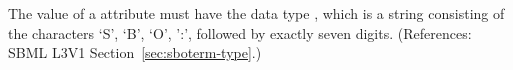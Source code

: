 The value of a  attribute must have the data type
, which is a string consisting of the characters `S', `B',
`O', ':', followed by exactly seven digits.  (References: SBML
L3V1 Section~\ref{sec:sboterm-type}.)
